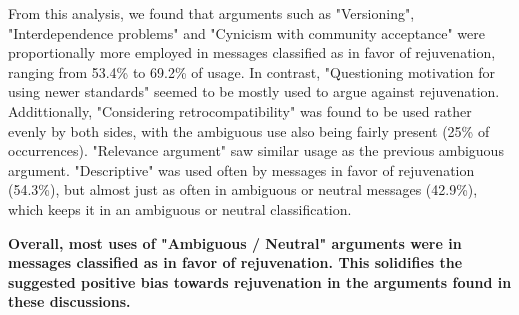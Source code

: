 From this analysis, we found that arguments such as "Versioning", "Interdependence problems" and "Cynicism with community acceptance" were proportionally more employed in messages classified as in favor of rejuvenation, ranging from 53.4\% to 69.2\% of usage. In contrast, "Questioning motivation for using newer standards" seemed to be mostly used to argue against rejuvenation. Addittionally, "Considering retrocompatibility" was found to be used rather evenly by both sides, with the ambiguous use also being fairly present (25\% of occurrences). "Relevance argument" saw similar usage as the previous ambiguous argument. "Descriptive" was used often by messages in favor of rejuvenation (54.3\%), but almost just as often in ambiguous or neutral messages (42.9\%), which keeps it in an ambiguous or neutral classification.

\textbf{Overall, most uses of "Ambiguous / Neutral" arguments were in messages classified as in favor of rejuvenation. This solidifies the suggested positive bias towards rejuvenation in the arguments found in these discussions.}
